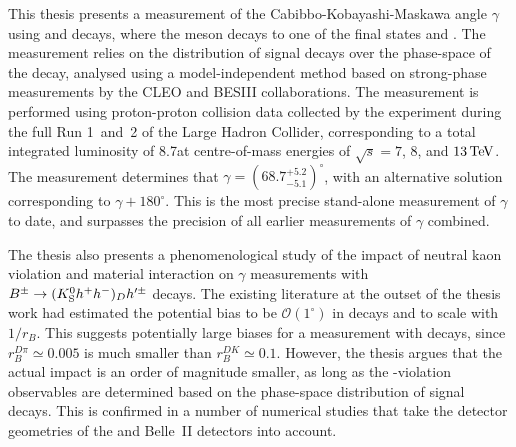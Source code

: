 This thesis presents a measurement of the Cabibbo-Kobayashi-Maskawa angle $\gamma$ using \BtoDK and \BtoDpi decays, where the \D meson decays to one of the final states \Kspipi and \KsKK.  The measurement relies on the distribution of signal decays over the phase-space of the \D decay, analysed using a model-independent method based on strong-phase measurements by the CLEO and BESIII collaborations. The measurement is performed using proton-proton collision data collected by the \lhcb experiment during the full Run 1~and~2 of the Large Hadron Collider, corresponding to a total integrated luminosity of 8.7\invfb at centre-of-mass energies of $\sqrt s =7$, $8$, and $13\text{\,Te\kern -0.1em V}$. The measurement determines that $\gamma= (68.7^{+5.2}_{-5.1})^\circ$, with an alternative solution corresponding to $\gamma+180^\circ$. This is the most precise stand-alone measurement of $\gamma$ to date, and surpasses the precision of all earlier measurements of $\gamma$ combined. 

The thesis also presents a phenomenological study of the impact of neutral kaon \CP violation and material interaction on $\gamma$ measurements with ${{{B}^\pm}\rightarrow ({{K}^0_{\mathrm{S}}} h^+h^-)_D h'^\pm}$ decays. The existing literature at the outset of the thesis work had estimated the potential bias to be $\mathcal O(1^\circ)$ in \BtoDK decays and to scale with $1/r_B$. This suggests potentially large biases for a measurement with \BtoDpi decays, since $r_B^{D\pi}\simeq0.005$ is much smaller than $r_B^{DK}\simeq 0.1$. However, the thesis argues that the actual impact is an order of magnitude smaller, as long as the \CP-violation observables are determined based on the phase-space distribution of signal decays. This is confirmed in a number of numerical studies that take the detector geometries of the \lhcb and Belle~II detectors into account.
